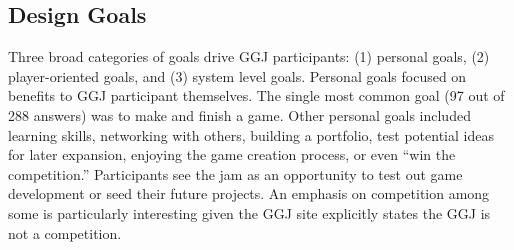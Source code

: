 \documentclass{sig-alternate}
\begin{document}

\subsection{Design Goals}
Three broad categories of goals drive GGJ participants: (1) personal goals, (2) player-oriented goals, and (3) system level goals.
Personal goals focused on benefits to GGJ participant themselves. 
The single most common goal (97 out of 288 answers) was to make and finish a game. 
Other personal goals included learning skills, networking with others, building a portfolio, test potential ideas for later expansion, enjoying the game creation process, or even ``win the competition.'' 
Participants see the jam as an opportunity to test out game development or seed their future projects.
An emphasis on competition among some is particularly interesting given the GGJ site explicitly states the GGJ is not a competition. %
\end{document}
